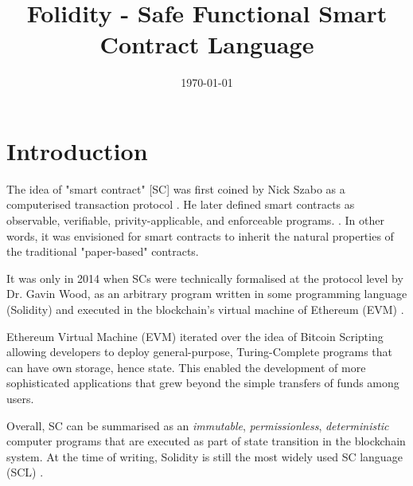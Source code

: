\documentclass[oneside]{ecsproject}     %
\begin{document}
\frontmatter
\title      {Folidity - Safe Functional Smart Contract Language}
\addresses  {\groupname\\\deptname\\\univname}
\date       {\today}
\subject    {}
\keywords   {}
\maketitle
\tableofcontents
\mainmatter

\chapter{Introduction}

The idea of "smart contract" [SC] was first coined by Nick Szabo as a computerised transaction protocol \cite{nz_sc}.
He later defined smart contracts as observable, verifiable, privity-applicable, and enforceable programs. \cite{nz_sc_bb}.
In other words, it was envisioned for smart contracts to inherit the natural properties of the traditional
"paper-based" contracts.

It was only in 2014 when SCs were technically formalised at the protocol level by Dr. Gavin Wood, as an arbitrary program
written in some programming language (Solidity) and executed in the blockchain's virtual machine of Ethereum (EVM) \cite{eth_yellow_paper}.

Ethereum Virtual Machine (EVM) iterated over the idea of Bitcoin Scripting allowing developers to deploy general-purpose, Turing-Complete
programs that can have own storage, hence state. This enabled the development of more sophisticated applications that grew beyond
the simple transfers of funds among users.

Overall, SC can be summarised as an \textit{immutable}, \textit{permissionless}, \textit{deterministic} computer programs 
that are executed as part of state transition in the blockchain system. 
At the time of writing, Solidity is still the most widely used SC language (SCL) \cite{sc_survey}.
\end{document}

